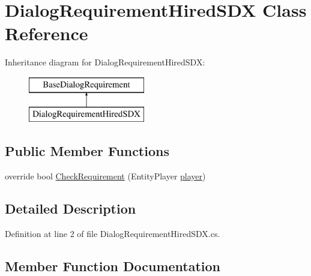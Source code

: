 \hypertarget{class_dialog_requirement_hired_s_d_x}{}\section{Dialog\+Requirement\+Hired\+S\+DX Class Reference}
\label{class_dialog_requirement_hired_s_d_x}
Inheritance diagram for Dialog\+Requirement\+Hired\+S\+DX\+:\begin{figure}[H]
\begin{center}
\leavevmode
\includegraphics[height=2.000000cm]{d8/d4e/class_dialog_requirement_hired_s_d_x}
\end{center}
\end{figure}
\subsection*{Public Member Functions}
\begin{DoxyCompactItemize}
\item 
override bool \mbox{\hyperlink{class_dialog_requirement_hired_s_d_x_a67ae324d864d3ee4d39c0f40e72874b7}{Check\+Requirement}} (Entity\+Player \mbox{\hyperlink{_sphere_i_i_01_music_01_boxes_2_config_2_localization_8txt_a4e2cb8aeff651600ea1cc57fe5a929a4}{player}})
\end{DoxyCompactItemize}


\subsection{Detailed Description}


Definition at line 2 of file Dialog\+Requirement\+Hired\+S\+D\+X.\+cs.



\subsection{Member Function Documentation}
\mbox{\label{class_dialog_requirement_hired_s_d_x_a67ae324d864d3ee4d39c0f40e72874b7}} 
